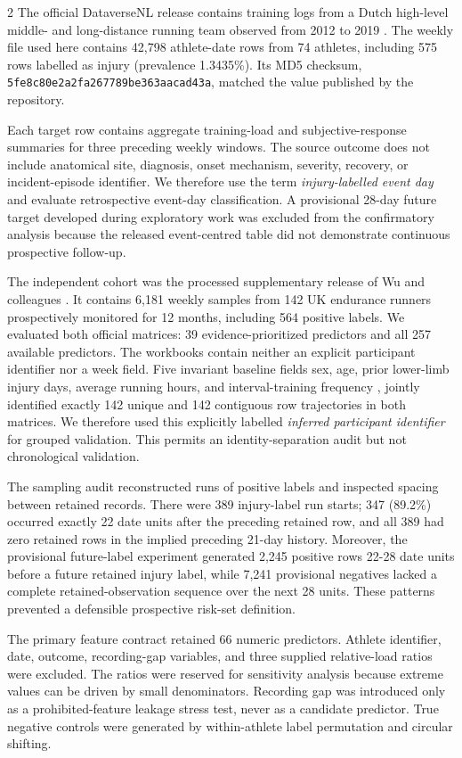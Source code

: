 \documentclass[11pt,a4paper]{article}
\begin{document}
\begin{multicols}{2}
The official DataverseNL release contains training logs from a Dutch high-level middle- and long-distance running team observed from 2012 to 2019 \cite{lovdaldataverse2021}. The weekly file used here contains 42,798 athlete-date rows from 74 athletes, including 575 rows labelled as injury (prevalence 1.3435\%). Its MD5 checksum, \texttt{5fe8c80e2a2fa267789be363aacad43a}, matched the value published by the repository.

Each target row contains aggregate training-load and subjective-response summaries for three preceding weekly windows. The source outcome does not include anatomical site, diagnosis, onset mechanism, severity, recovery, or incident-episode identifier. We therefore use the term \emph{injury-labelled event day} and evaluate retrospective event-day classification. A provisional 28-day future target developed during exploratory work was excluded from the confirmatory analysis because the released event-centred table did not demonstrate continuous prospective follow-up.

The independent cohort was the processed supplementary release of Wu and colleagues \cite{wu2026}. It contains 6,181 weekly samples from 142 UK endurance runners prospectively monitored for 12 months, including 564 positive labels. We evaluated both official matrices: 39 evidence-prioritized predictors and all 257 available predictors. The workbooks contain neither an explicit participant identifier nor a week field. Five invariant baseline fields sex, age, prior lower-limb injury days, average running hours, and interval-training frequency , jointly identified exactly 142 unique and 142 contiguous row trajectories in both matrices. We therefore used this explicitly labelled \emph{inferred participant identifier} for grouped validation. This permits an identity-separation audit but not chronological validation.

The sampling audit reconstructed runs of positive labels and inspected spacing between retained records. There were 389 injury-label run starts; 347 (89.2\%) occurred exactly 22 date units after the preceding retained row, and all 389 had zero retained rows in the implied preceding 21-day history. Moreover, the provisional future-label experiment generated 2,245 positive rows 22-28 date units before a future retained injury label, while 7,241 provisional negatives lacked a complete retained-observation sequence over the next 28 units. These patterns prevented a defensible prospective risk-set definition.

The primary feature contract retained 66 numeric predictors. Athlete identifier, date, outcome, recording-gap variables, and three supplied relative-load ratios were excluded. The ratios were reserved for sensitivity analysis because extreme values can be driven by small denominators. Recording gap was introduced only as a prohibited-feature leakage stress test, never as a candidate predictor. True negative controls were generated by within-athlete label permutation and circular shifting.


\end{multicols}
\end{document}
